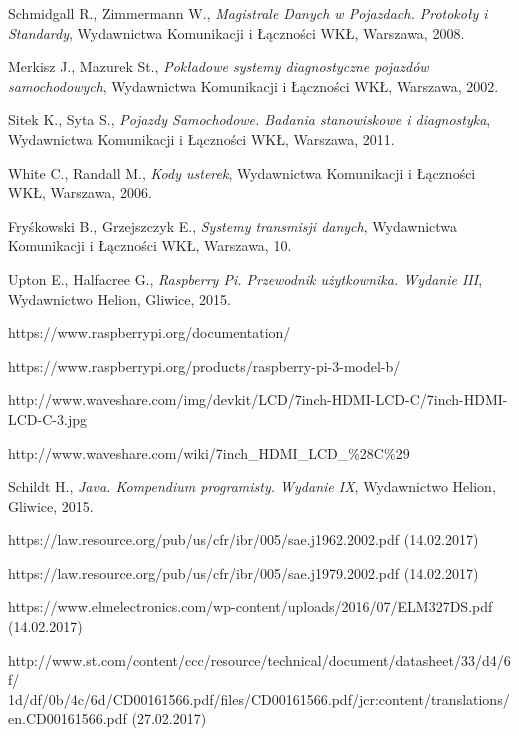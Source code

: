 \documentclass[12pt, twoside]{article} %
\numberwithin{equation}{subsection}
\numberwithin{figure}{section}
\numberwithin{table}{section}
\begin{document}
\begin{thebibliography}{99}

		Schmidgall R., Zimmermann W., \emph{Magistrale Danych w Pojazdach. Protokoły i Standardy}, Wydawnictwa Komunikacji i Łączności WKŁ, Warszawa, 2008.

		Merkisz J., Mazurek St., \emph{Pokładowe systemy diagnostyczne pojazdów samochodowych}, Wydawnictwa Komunikacji i Łączności WKŁ, Warszawa, 2002.		
		
		Sitek K., Syta S., \emph{Pojazdy Samochodowe. Badania stanowiskowe i diagnostyka}, Wydawnictwa Komunikacji i Łączności WKŁ, Warszawa, 2011.
		
		White C., Randall M., \emph{Kody usterek}, Wydawnictwa Komunikacji i Łączności WKŁ, Warszawa, 2006.
		
		Fryśkowski B., Grzejszczyk E., \emph{Systemy transmisji danych}, Wydawnictwa Komunikacji i Łączności WKŁ, Warszawa, 10.
		
		Upton E., Halfacree G., \emph{Raspberry Pi. Przewodnik użytkownika. Wydanie III}, Wydawnictwo Helion, Gliwice, 2015.
		
		https://www.raspberrypi.org/documentation/
		
		https://www.raspberrypi.org/products/raspberry-pi-3-model-b/
		
		http://www.waveshare.com/img/devkit/LCD/7inch-HDMI-LCD-C/7inch-HDMI-LCD-C-3.jpg
		
		http://www.waveshare.com/wiki/7inch\_HDMI\_LCD\_\%28C\%29	
	
		Schildt H., \emph{Java. Kompendium programisty. Wydanie IX}, Wydawnictwo Helion, Gliwice, 2015.
		
		https://law.resource.org/pub/us/cfr/ibr/005/sae.j1962.2002.pdf (14.02.2017)
		
		https://law.resource.org/pub/us/cfr/ibr/005/sae.j1979.2002.pdf (14.02.2017)
		
		https://www.elmelectronics.com/wp-content/uploads/2016/07/ELM327DS.pdf (14.02.2017)
		
		http://www.st.com/content/ccc/resource/technical/document/datasheet/33/d4/6f/
		1d/df/0b/4c/6d/CD00161566.pdf/files/CD00161566.pdf/jcr:content/translations/
		en.CD00161566.pdf (27.02.2017)
		

\end{thebibliography}
\end{document}
